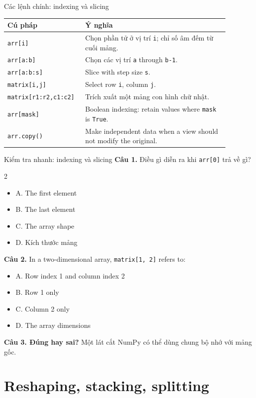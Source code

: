 \documentclass[aspectratio=169,11pt]{beamer}
\newcommand{\quiztitle}[1]{\textbf{\textcolor{QuizOrange}{#1}}}
\begin{document}
\begin{frame}{Các lệnh chính: indexing và slicing}
\small
\begin{tabular}{p{0.28\linewidth}p{0.61\linewidth}}
\toprule
\textbf{Cú pháp} & \textbf{Ý nghĩa} \\
\midrule
\texttt{arr[i]} & Chọn phần tử ở vị trí \texttt{i}; chỉ số âm đếm từ cuối mảng. \\
\texttt{arr[a:b]} & Chọn các vị trí \texttt{a} through \texttt{b-1}. \\
\texttt{arr[a:b:s]} & Slice with step size \texttt{s}. \\
\texttt{matrix[i,j]} & Select row \texttt{i}, column \texttt{j}. \\
\texttt{matrix[r1:r2,c1:c2]} & Trích xuất một mảng con hình chữ nhật. \\
\texttt{arr[mask]} & Boolean indexing: retain values where \texttt{mask} is \texttt{True}. \\
\texttt{arr.copy()} & Make independent data when a view should not modify the original. \\
\bottomrule
\end{tabular}
\end{frame}

\begin{frame}{Kiểm tra nhanh: indexing và slicing}
\small
\quiztitle{Câu 1.} Điều gì diễn ra khi \texttt{arr[0]} trả về gì?
\begin{multicols}{2}
\begin{itemize}
  \item A. The first element
  \item B. The last element
  \item C. The array shape
  \item D. Kích thước mảng
\end{itemize}
\end{multicols}
\quiztitle{Câu 2.} In a two-dimensional array, \texttt{matrix[1, 2]} refers to:
\begin{itemize}
  \item A. Row index 1 and column index 2
  \item B. Row 1 only
  \item C. Column 2 only
  \item D. The array dimensions
\end{itemize}
\quiztitle{Câu 3. Đúng hay sai?} Một lát cắt NumPy có thể dùng chung bộ nhớ với mảng gốc.
\end{frame}

\section{Reshaping, stacking, splitting}
\end{document}
